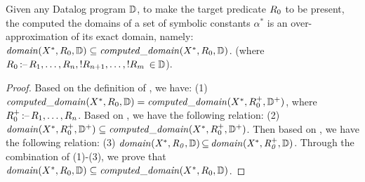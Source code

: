 \documentclass[acmsmall,screen,review,anonymous,nonacm]{acmart}
\begin{document}
\begin{theorem} \label{theom:Completenessofthedomaincalculation}
Given any Datalog program $\mathbb{D}$, 
to make the target predicate $R_0$ to be present, the computed the domains of a set of symbolic constants $\alpha^*$ is an over-approximation of its exact domain, namely: 
$
\mathit{domain}(X^*, R_0, \mathbb{D})
\subseteq
\mathit{computed\_domain}(X^*, R_0, \mathbb{D})$. 
(where $R_0{\,\text{:--}\,}R_1,\dots,R_n, 
!R_{n+1}, \dots, !R_m$ $\in \mathbb{D}$). 
{%
\small
\begin{proof}
Based on the definition of , 
we have: (1) ${\mathit{computed\_domain}(X^*, R_0, \mathbb{D})} = \mathit{computed\_domain}(X^*, R_0^+, \mathbb{D}^+)$, 
where $R_0^+{\,\text{:--}\,}R_1,\dots,R_n$.
Based on , 
we have the following relation: (2) $\mathit{domain}(X^*, R_0^+, \mathbb{D}^+) \subseteq \mathit{computed\_domain}(X^*, R_0^+, \mathbb{D}^+)$.
Then based on , we have the following relation: (3) ${\mathit{domain}\mathit{(X^*, R_0, \mathbb{D})}} {\,\subseteq\,} \mathit{domain}\mathit{(X^*, R_0^+, \mathbb{D})}
$.
Through the combination of (1)-(3), we prove that $
\mathit{domain}(X^*, R_0, \mathbb{D})
\subseteq
\mathit{computed\_domain}(X^*, R_0, \mathbb{D})$. 
\end{proof}}
\begin{comment}
For the set of symbolic constants  $\alpha^*$, its exact domain   
in a set of stratified Datalog rules  \code{\drule^*} is a subset of its  
exact domain in 
the updated Datalog rules  \code{\drule^{*}_{\m{pos}}} where all negative literals have been removed, \ie  \code{
\exactDoamin(\alpha, \drule^*) \,{\subseteq}\, 
\exactDoamin(\alpha, \drule^{*}_{\m{pos}}) }. 
The domain calculated by our method for each symbolic constant is a superset of its exact domain. 
We introduce extra placeholder constants to represent the 
constants that do not appear in the program, where such unseen constants can only come from the target output fact. 
For the domain, based on the constants within the program, we over-approximate its range. 
Via  and \lemmaref{lemma:reasoning_over_approx} respectively. 
\end{comment}
\vspace{-2mm}
\end{theorem}
\end{document}
